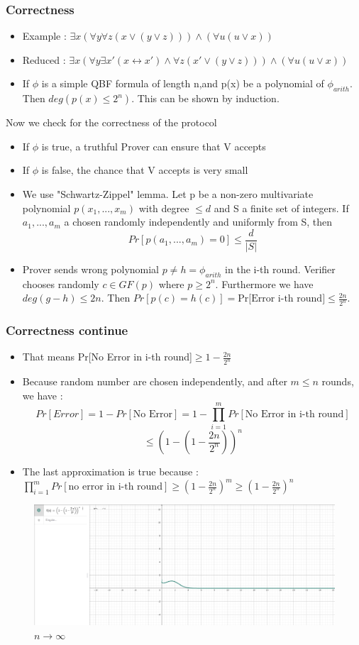 \documentclass[hyperref={pdfpagelabels=false},t,10pt]{beamer}
\begin{document}
\begin{frame}
  \frametitle{Correctness}
  \begin{itemize}
    \item Example : $\exists x (\forall y \forall z (x \lor (y \lor z))) \land (\forall u (u \lor x))$
    \item Reduced : $\exists x (\forall y \exists x'  (x \leftrightarrow x') \land \forall z(x' \lor (y \lor z))) \land (\forall u (u \lor x))$
    \item If $\phi$ is a simple QBF formula of length n,and p(x) be a polynomial of $\phi_{arith}$. Then $deg(p(x) \leq 2^n)$. This can be shown by induction. \pause
  \end{itemize}
  Now we check for the correctness of the protocol

  \begin{itemize}
    \item If $\phi$ is true, a truthful Prover can ensure that V accepts \pause
    \item If $\phi$ is false, the chance that V accepts is very small \pause
    \item We use "Schwartz-Zippel" lemma. Let p be a non-zero multivariate polynomial $p(x_1,...,x_m)$ with degree $\leq d$ and S a finite set of integers.
    If $a_1,..., a_m$ a chosen randomly independently and uniformly from S, then $$Pr[p(a_1,...,a_m)= 0] \leq \frac{d}{|S|}$$ \pause
    \item Prover sends wrong polynomial $p \neq h =\phi_{arith}$ in the i-th round. Verifier chooses randomly $c\in GF(p)$ where $p\geq 2^n$. Furthermore we have $deg(g-h) \leq 2n$.
    Then $Pr[p(c) = h(c)] = \mbox{Pr[Error i-th round]} \leq \frac{2n}{2^n}$.
  \end{itemize}
\end{frame}

\begin{frame}
  \frametitle{Correctness continue}
  \begin{itemize}
    \item That means Pr[No Error in i-th round]$\geq 1- \frac{2n}{2^n}$
    \item Because random number are chosen independently, and after $m \leq n$ rounds, we have : 
    $$Pr[Error] = 1 - Pr[\mbox{No Error}] = 1- \prod_{i=1}^{m} Pr[\mbox{No Error in i-th round}]$$
    $$ \leq (1-(1-\frac{2n}{2^n}))^n$$ \newline
    \item  The last approximation is true because : $\prod_{i=1}^{m} Pr[\mbox{no error in i-th round}] \geq (1-\frac{2n}{2^n})^m \geq (1- \frac{2n}{2^n})^n$
  \end{itemize}
\end{frame}

\begin{frame}
  \begin{figure}[h]
    \centering
    \includegraphics[scale= 0.25]{Copy.png}
    \caption{$n \rightarrow \infty$}
  \end{figure}
\end{frame}
\end{document}
